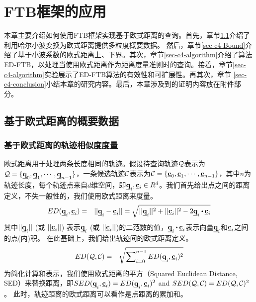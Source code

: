 \chapter{FTB框架的应用}\label{chapter:FTBED}
本章主要介绍如何使用FTB框架实现基于欧式距离的查询。首先，章节\ref{sec-c4-EDsummary}介绍了利用哈尔小波变换为欧式距离提供多粒度概要数据。 然后，章节\ref{sec-c4-Bound}介绍了基于小波系数的欧式距离上、下界。其次，章节\ref{sec-c4-algorithm}介绍了算法ED-FTB，以处理当使用欧式距离作为距离度量准则时的查询。接着，章节\ref{sec-c4-algorithm}实验展示了ED-FTB算法的有效性和可扩展性。再其次，章节 \ref{sec-c4-conclusion}小结本章的研究内容。最后，本章涉及到的证明内容放在附件部分。

\section{基于欧式距离的概要数据}\label{sec-c4-EDsummary}
\subsection{基于欧式距离的轨迹相似度度量}\label{sec-c4-ED}
欧式距离用于处理两条长度相同的轨迹。假设待查询轨迹$\cal Q$表示为${\cal Q}=\{\emph{{\textbf{q}}}_{0}, \emph{{\textbf{q}}}_{1}, \cdots, \emph{{\textbf{q}}}_{n-1}\}$，一条候选轨迹$\cal C$表示为${\cal C}=\{\emph{{\textbf{c}}}_{0}, \emph{{\textbf{c}}}_{1}, \cdots, \emph{{\textbf{c}}}_{n-1}\}$，其中$n$为轨迹长度，每个轨迹点来自$d$维空间，即$\emph{{\textbf{q}}}_{i},\emph{{\textbf{c}}}_{i} \in R^{d}$。我们首先给出点之间的距离定义，不失一般性的，我们使用欧式距离来度量。
\begin{eqnarray}
ED(\vq_{i}, \vc_{i}) & = & ||\vq_i-\vc_i|| =\sqrt{||\vq_{i}||^2+||\vc_{i}||^2- 2 \vq_{i}\bigcdot \vc_{i}}
\end{eqnarray}
其中$||\emph{{\textbf{q}}}_i||$ (或 $||\emph{{\textbf{c}}}_i||$) 表示$\emph{{\textbf{q}}}_i$ (或 $||\emph{{\textbf{c}}}_i||$)的二范数的值，$\vq_{i}\bigcdot \vc_{i}$表示向量$\emph{{\textbf{q}}}_{i}$和$\emph{{\textbf{c}}}_{i}$之间的点(内)积。
在此基础上，我们给出轨迹间的欧式距离定义。
\begin{eqnarray}
ED({\cal Q}, {\cal C}) & = & \sqrt{ \sum\nolimits_{i=0}^{n-1}ED(\emph{{\textbf{q}}}_{i},\emph{{\textbf{c}}}_{i})^{2}}
\end{eqnarray}
为简化计算和表示，我们使用欧式距离的平方（Squared Euclidean Distance, SED）来替换距离，即$SED(\emph{{\textbf{q}}}_{i}, \emph{{\textbf{c}}}_{i})=ED(\emph{{\textbf{q}}}_{i}, \emph{{\textbf{c}}}_{i})^2$ and $SED({\cal Q}, {\cal C})= ED({\cal Q}, {\cal C})^2$。
此时，轨迹距离的欧式距离可以看作是点距离的累加和。


